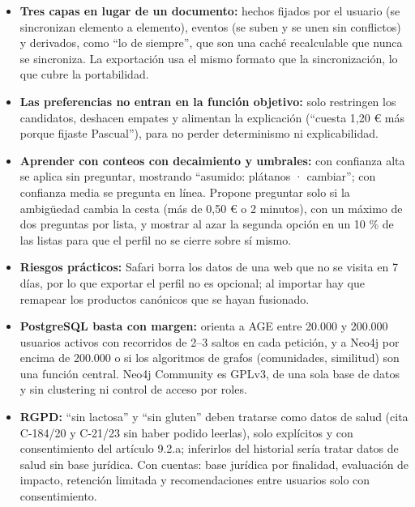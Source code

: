 \begin{tcolorbox}[colback=responsecolor, title=Insights de DeepSeek, colframe=gray!60!black, breakable]
	\begin{itemize}
		\item \textbf{Tres capas en lugar de un documento:} hechos fijados por el usuario (se sincronizan elemento a elemento), eventos (se suben y se unen sin conflictos) y derivados, como ``lo de siempre'', que son una caché recalculable que nunca se sincroniza. La exportación usa el mismo formato que la sincronización, lo que cubre la portabilidad.

		\item \textbf{Las preferencias no entran en la función objetivo:} solo restringen los candidatos, deshacen empates y alimentan la explicación (``cuesta 1,20 € más porque fijaste Pascual''), para no perder determinismo ni explicabilidad.

		\item \textbf{Aprender con conteos con decaimiento y umbrales:} con confianza alta se aplica sin preguntar, mostrando ``asumido: plátanos · cambiar''; con confianza media se pregunta en línea. Propone preguntar solo si la ambigüedad cambia la cesta (más de 0,50 € o 2 minutos), con un máximo de dos preguntas por lista, y mostrar al azar la segunda opción en un 10 \% de las listas para que el perfil no se cierre sobre sí mismo.

		\item \textbf{Riesgos prácticos:} Safari borra los datos de una web que no se visita en 7 días, por lo que exportar el perfil no es opcional; al importar hay que remapear los productos canónicos que se hayan fusionado.

		\item \textbf{PostgreSQL basta con margen:} orienta a AGE entre 20.000 y 200.000 usuarios activos con recorridos de 2--3 saltos en cada petición, y a Neo4j por encima de 200.000 o si los algoritmos de grafos (comunidades, similitud) son una función central. Neo4j Community es GPLv3, de una sola base de datos y sin clustering ni control de acceso por roles.

		\item \textbf{RGPD:} ``sin lactosa'' y ``sin gluten'' deben tratarse como datos de salud (cita C-184/20 y C-21/23 sin haber podido leerlas), solo explícitos y con consentimiento del artículo 9.2.a; inferirlos del historial sería tratar datos de salud sin base jurídica. Con cuentas: base jurídica por finalidad, evaluación de impacto, retención limitada y recomendaciones entre usuarios solo con consentimiento.
	\end{itemize}
\end{tcolorbox}

